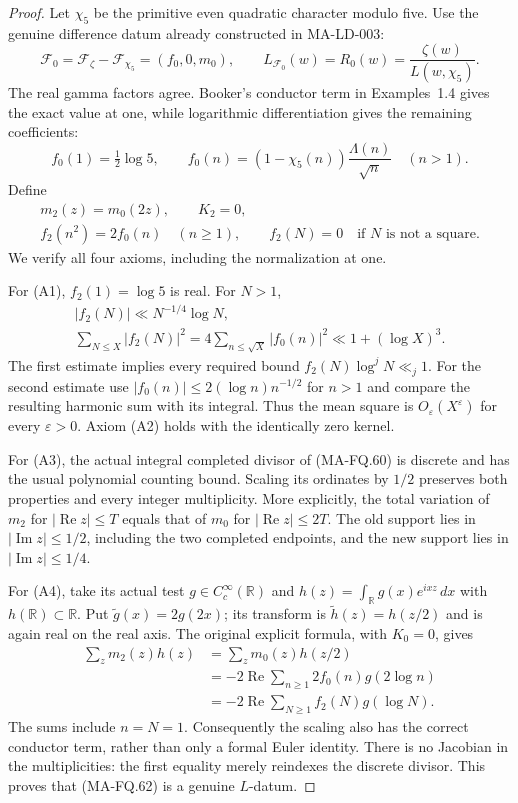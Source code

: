\begin{proof}
Let $\chi_5$ be the primitive even quadratic character modulo five.
Use the genuine difference datum already constructed in MA-LD-003:
\[
 \mathcal F_0=\mathcal F_\zeta-\mathcal F_{\chi_5}
             =(f_0,0,m_0),\qquad
 L_{\mathcal F_0}(w)=R_0(w)=\frac{\zeta(w)}{L(w,\chi_5)}.
 \tag{MA-FQ.60}
\]
The real gamma factors agree.  Booker's conductor term in
Examples~1.4 gives the exact value at one, while logarithmic
differentiation gives the remaining coefficients:
\[
 f_0(1)=\tfrac12\log5,\qquad
 f_0(n)=(1-\chi_5(n))\frac{\Lambda(n)}{\sqrt n}
                                      \quad(n>1).
 \tag{MA-FQ.61}
\]
Define
\[
 \begin{gathered}
 m_2(z)=m_0(2z),\qquad K_2=0,\\
 f_2(n^2)=2f_0(n)\quad(n\ge1),\qquad
 f_2(N)=0\quad\text{if $N$ is not a square}.
 \end{gathered}
 \tag{MA-FQ.62}
\]
We verify all four axioms, including the normalization at one.

For (A1), $f_2(1)=\log5$ is real.  For $N>1$,
\[
 \begin{gathered}
 |f_2(N)|\ll N^{-1/4}\log N,\\
 \sum_{N\le X}|f_2(N)|^2
     =4\sum_{n\le\sqrt X}|f_0(n)|^2
     \ll 1+(\log X)^3 .
 \end{gathered}
 \tag{MA-FQ.63}
\]
The first estimate implies every required bound
$f_2(N)\log^jN\ll_j1$.  For the second estimate use
$|f_0(n)|\le2(\log n)n^{-1/2}$ for $n>1$ and compare
the resulting harmonic sum with its integral.  Thus the
mean square is $O_\varepsilon(X^\varepsilon)$ for every
$\varepsilon>0$.  Axiom (A2) holds with the identically
zero kernel.

For (A3), the actual integral completed divisor of (MA-FQ.60)
is discrete and has the usual polynomial counting bound.
Scaling its ordinates by $1/2$ preserves both properties and
every integer multiplicity.  More explicitly, the total variation
of $m_2$ for $|\operatorname{Re}z|\le T$ equals that of $m_0$
for $|\operatorname{Re}z|\le2T$.  The old support lies in
$|\operatorname{Im}z|\le1/2$, including the two completed
endpoints, and the new support lies in
$|\operatorname{Im}z|\le1/4$.

For (A4), take its actual test $g\in C_c^\infty(\mathbb R)$
and $h(z)=\int_{\mathbb R}g(x)e^{ixz}\,dx$ with
$h(\mathbb R)\subset\mathbb R$.  Put
$\widetilde g(x)=2g(2x)$; its transform is
$\widetilde h(z)=h(z/2)$ and is again real on the real axis.
The original explicit formula, with $K_0=0$, gives
\[
 \begin{aligned}
 \sum_zm_2(z)h(z)
   &=\sum_zm_0(z)h(z/2)\\
   &=-2\operatorname{Re}\sum_{n\ge1}2f_0(n)g(2\log n)\\
   &=-2\operatorname{Re}\sum_{N\ge1}f_2(N)g(\log N).
 \end{aligned}
 \tag{MA-FQ.64}
\]
The sums include $n=N=1$.  Consequently the scaling also
has the correct conductor term, rather than only a formal
Euler identity.  There is no Jacobian in the multiplicities:
the first equality merely reindexes the discrete divisor.
This proves that (MA-FQ.62) is a genuine $L$-datum.


\end{proof}
